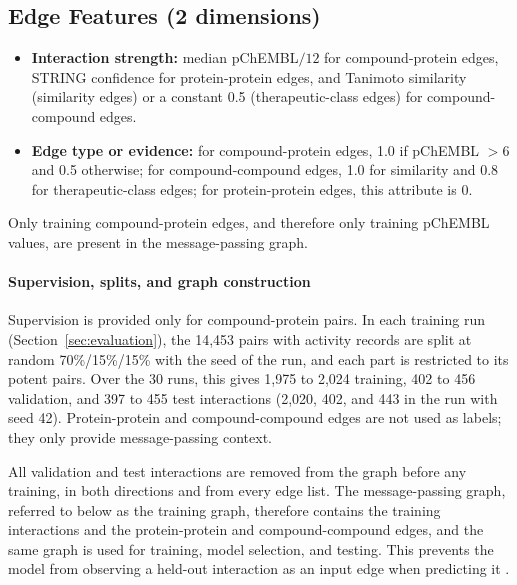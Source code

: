 \documentclass[11pt,letterpaper]{article}
\begin{document}
\subsection*{Edge Features (2 dimensions)}
\begin{itemize}
    \item \textbf{Interaction strength:} median pChEMBL$/12$ for compound-protein edges, STRING confidence for protein-protein edges, and Tanimoto similarity (similarity edges) or a constant 0.5 (therapeutic-class edges) for compound-compound edges.
    \item \textbf{Edge type or evidence:} for compound-protein edges, 1.0 if pChEMBL $> 6$ and 0.5 otherwise; for compound-compound edges, 1.0 for similarity and 0.8 for therapeutic-class edges; for protein-protein edges, this attribute is 0.
\end{itemize}
Only training compound-protein edges, and therefore only training pChEMBL values, are present in the message-passing graph.

\paragraph{Supervision, splits, and graph construction}
Supervision is provided only for compound-protein pairs. In each training run (Section~\ref{sec:evaluation}), the 14,453 pairs with activity records are split at random 70\%/15\%/15\% with the seed of the run, and each part is restricted to its potent pairs. Over the 30 runs, this gives 1,975 to 2,024 training, 402 to 456 validation, and 397 to 455 test interactions (2,020, 402, and 443 in the run with seed 42). Protein-protein and compound-compound edges are not used as labels; they only provide message-passing context.

All validation and test interactions are removed from the graph before any training, in both directions and from every edge list. The message-passing graph, referred to below as the training graph, therefore contains the training interactions and the protein-protein and compound-compound edges, and the same graph is used for training, model selection, and testing. This prevents the model from observing a held-out interaction as an input edge when predicting it \cite{kaufman2012leakage}.
\end{document}
